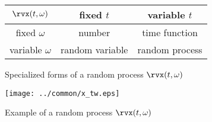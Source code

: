 \begin{figure}[ht]\color{figcolor}
\begin{center}
   \begin{tabular}{|c||c|c|}
      \hline
         $\rvx(t,\omega)$ &  fixed $t$      & variable $t$   \\
      \hline
      \hline
         fixed    $\omega$ & number          & time function  \\
      \hline
         variable $\omega$ & random variable & random process \\
      \hline
   \end{tabular}
\caption{
   Specialized forms of a random process $\rvx(t,\omega)$
   \label{fig:X(t,w)}
   }
\end{center}
\end{figure}

\begin{figure}[ht]\color{figcolor}
\begin{center}
\texttt{[image: ../common/x\_tw.eps]}
\end{center}
\caption{
  Example of a random process $\rvx(t,\omega)$
  \label{fig:X(t,w)graph}
}
\end{figure}


